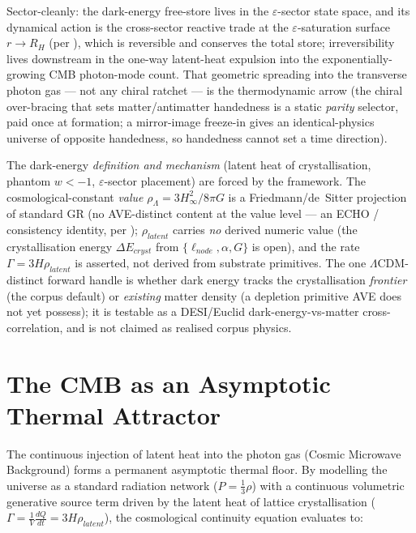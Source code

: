 Sector-cleanly: the dark-energy free-store lives in the $\varepsilon$-sector state
space, and its dynamical action is the cross-sector reactive trade at the
$\varepsilon$-saturation surface $r \to R_H$ (per ),
which is reversible and conserves the total store; irreversibility lives
downstream in the one-way latent-heat expulsion into the exponentially-growing CMB
photon-mode count. That geometric spreading into the transverse photon gas --- not
any chiral ratchet --- is the thermodynamic arrow (the chiral over-bracing that
sets matter/antimatter handedness is a static \emph{parity} selector, paid once at
formation; a mirror-image freeze-in gives an identical-physics universe of opposite
handedness, so handedness cannot set a time direction).

\begin{tcolorbox}[colback=gray!4!white, colframe=gray!55!black, title={\textbf{Scope: what is derived vs imported}}]
The dark-energy \emph{definition and mechanism} (latent heat of crystallisation,
phantom $w<-1$, $\varepsilon$-sector placement) are forced by the framework. The
cosmological-constant \emph{value} $\rho_\Lambda = 3H_\infty^2/8\pi G$ is a
Friedmann/de~Sitter projection of standard GR (no AVE-distinct content at the value
level --- an ECHO / consistency identity, per );
$\rho_{latent}$ carries \emph{no} derived numeric value (the crystallisation energy
$\Delta E_{cryst}$ from $\{\ell_{node}, \alpha, G\}$ is open), and the rate
$\Gamma = 3H\rho_{latent}$ is asserted, not derived from substrate primitives. The
one $\Lambda$CDM-distinct forward handle is whether dark energy tracks the
crystallisation \emph{frontier} (the corpus default) or \emph{existing} matter
density (a depletion primitive AVE does not yet possess); it is testable as a
DESI/Euclid dark-energy-vs-matter cross-correlation, and is not claimed as realised
corpus physics.
\end{tcolorbox}

\section{The CMB as an Asymptotic Thermal Attractor}

The continuous injection of latent heat into the photon gas (Cosmic Microwave Background) forms a permanent asymptotic thermal floor. By modelling the universe as a standard radiation network ($P = \frac{1}{3}\rho$) with a continuous volumetric generative source term driven by the latent heat of lattice crystallisation ($\Gamma = \frac{1}{V}\frac{dQ}{dt} = 3H\rho_{latent}$), the cosmological continuity equation evaluates to:

